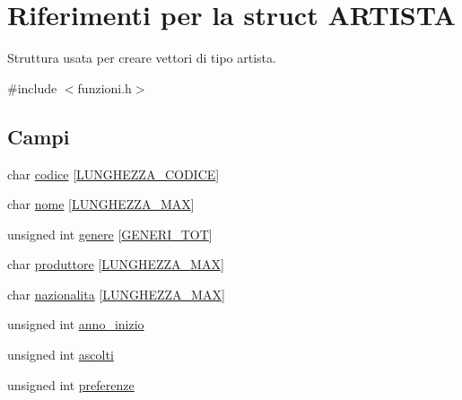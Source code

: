\hypertarget{struct_a_r_t_i_s_t_a}{}\section{Riferimenti per la struct A\+R\+T\+I\+S\+TA}
\label{struct_a_r_t_i_s_t_a}


Struttura usata per creare vettori di tipo artista.  




{\ttfamily \#include $<$funzioni.\+h$>$}

\subsection*{Campi}
\begin{DoxyCompactItemize}
\item 
char \mbox{\hyperlink{struct_a_r_t_i_s_t_a_a614effe8a3285fd1b6bd29e7bff7ff72}{codice}} \mbox{[}\mbox{\hyperlink{funzioni_8h_a15beac41f998f4495a79396160235665}{L\+U\+N\+G\+H\+E\+Z\+Z\+A\+\_\+\+C\+O\+D\+I\+CE}}\mbox{]}
\item 
char \mbox{\hyperlink{struct_a_r_t_i_s_t_a_a8ddd53b0e7cbe5f893e13b26a0203005}{nome}} \mbox{[}\mbox{\hyperlink{funzioni_8h_a2cdd71b92d6e869f8b094e32a6da6a62}{L\+U\+N\+G\+H\+E\+Z\+Z\+A\+\_\+\+M\+AX}}\mbox{]}
\item 
unsigned int \mbox{\hyperlink{struct_a_r_t_i_s_t_a_a27c2d0af7e1f8ac38c84bcfc71f87f4b}{genere}} \mbox{[}\mbox{\hyperlink{funzioni_8h_aadfbb01ff59a52b086b4c96f1a5e0cd2}{G\+E\+N\+E\+R\+I\+\_\+\+T\+OT}}\mbox{]}
\item 
char \mbox{\hyperlink{struct_a_r_t_i_s_t_a_a444c256b4120246fcbf1804377e61e32}{produttore}} \mbox{[}\mbox{\hyperlink{funzioni_8h_a2cdd71b92d6e869f8b094e32a6da6a62}{L\+U\+N\+G\+H\+E\+Z\+Z\+A\+\_\+\+M\+AX}}\mbox{]}
\item 
char \mbox{\hyperlink{struct_a_r_t_i_s_t_a_a9b2d858c8f1c17c58a15ad20eb10118e}{nazionalita}} \mbox{[}\mbox{\hyperlink{funzioni_8h_a2cdd71b92d6e869f8b094e32a6da6a62}{L\+U\+N\+G\+H\+E\+Z\+Z\+A\+\_\+\+M\+AX}}\mbox{]}
\item 
unsigned int \mbox{\hyperlink{struct_a_r_t_i_s_t_a_a776bd83463cbbd70affcbc08b7687675}{anno\+\_\+inizio}}
\item 
unsigned int \mbox{\hyperlink{struct_a_r_t_i_s_t_a_a94634853ac282b23729897e105865590}{ascolti}}
\item 
unsigned int \mbox{\hyperlink{struct_a_r_t_i_s_t_a_a864c672ed1a5c81d1daf02093e11eb05}{preferenze}}
\end{DoxyCompactItemize}


